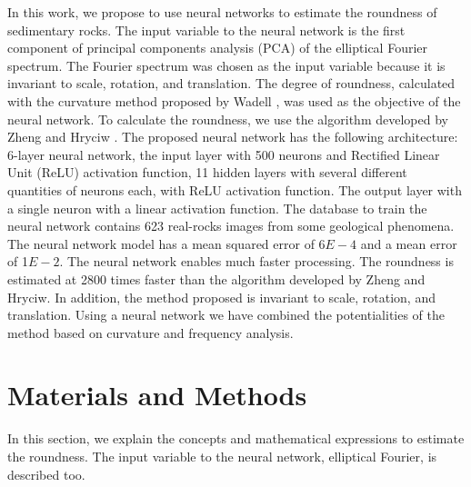 \documentclass[conference]{IEEEtran}
\begin{document}
In this work, we propose to use neural networks to estimate the roundness of sedimentary rocks. The input variable to the neural network is the first component of principal components analysis (PCA) of the elliptical Fourier spectrum. The Fourier spectrum was chosen as the input variable because it is invariant to scale, rotation, and translation. The degree of roundness, calculated with the curvature method proposed by Wadell \cite{b6}, was used as the objective of the neural network. To calculate the roundness, we use the algorithm developed by Zheng and Hryciw \cite{b7}. The proposed neural network has the following architecture: 6-layer neural network, the input layer with 500 neurons and Rectified Linear Unit (ReLU) activation function, 11 hidden layers with several different quantities of neurons each, with ReLU activation function. The output layer with a single neuron with a linear activation function. The database to train the neural network contains 623 real-rocks images from some geological phenomena. The neural network model has a mean squared error of 6$E-4$ and a mean error of 1$E-2$. The neural network enables much faster processing. The roundness is estimated at 2800 times faster than the algorithm developed by Zheng and Hryciw. In addition, the method proposed is invariant to scale, rotation, and translation. Using a neural network we have combined the potentialities of the method based on curvature and frequency analysis.


\section{Materials and Methods}
In this section, we explain the concepts and mathematical expressions to estimate the roundness. The input variable to the neural network, elliptical Fourier, is described too.
\end{document}
